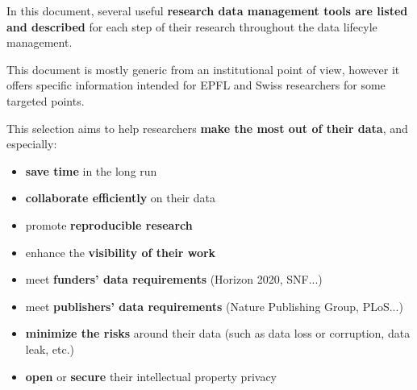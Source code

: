 In this document, several useful \textbf{research data management tools are listed and described} for each step of their research throughout the data lifecyle management.

\vspace{0.5cm}

This document is mostly generic from an institutional point of view, however it offers specific information intended for EPFL and Swiss researchers for some targeted points.

\vspace{0.5cm}

\noindent This selection aims to help researchers \textbf{make the most out of their data}, and especially:
\begin{itemize}
\item \textbf{save time} in the long run
\item \textbf{collaborate efficiently } on their data 
\item promote \textbf{reproducible research}
\item enhance the \textbf{visibility of their work} 
\item meet \textbf{funders' data requirements} (Horizon 2020, SNF...) 
\item meet \textbf{publishers' data requirements} (Nature Publishing Group, PLoS...) 
\item \textbf{minimize the risks} around their data (such as data loss or corruption, data leak, etc.)
\item  \textbf{open} or \textbf{secure} their intellectual property privacy
\end{itemize}


